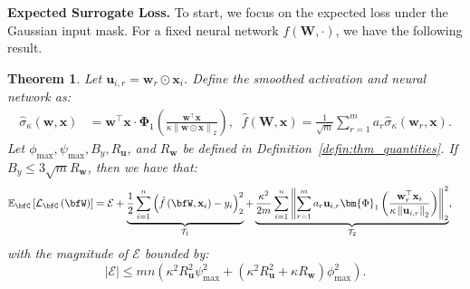 \documentclass[10pt]{article} %
\newtheorem{theorem}{Theorem}[section]
\theoremstyle{definition}
\theoremstyle{plain}
\newcommand{\paren}[1]{\left(#1\right)}
\newcommand{\norm}[1]{\left\|#1\right\|}
\newcommand{\act}[2]{\hat{\sigma}_{\kappa}\paren{#1,#2}}
\providecommand{\E}{\mathbb{E}}
\def\calL{{\mathcal{L}}}
\def\calT{{\mathcal{T}}}
\def\bfu{{\mathbf{u}}}\def\bfv{{\mathbf{v}}}\def\bfw{{\mathbf{w}}}\def\bfx{{\mathbf{x}}}
\begin{document}
\noindent \textbf{Expected Surrogate Loss.}
To start, we focus on the expected loss under the Gaussian input mask. For a fixed neural network $f\paren{\mathbf{W},\cdot}$, we have the following result.
\begin{theorem}
    \label{thm:exp_loss_approx}
    Let $\bfu_{i,r} = \bfw_r\odot\bfx_i$. Define the smoothed activation and neural network as:
    \begin{align*}
        \act{\bfw}{\bfx} &= \bfw^\top\bfx\cdot \bm{\Phi}_1\paren{\frac{\bfw^\top\bfx}{\kappa\norm{\bfw\odot\bfx}_2}},\;\;  \hat{f}\paren{\mathbf{W},\bfx}= \frac{1}{\sqrt{m}}\sum_{r=1}^ma_r\act{\bfw_r}{\bfx}.
    \end{align*}
    Let $\phi_{\max},\psi_{\max}, B_y, R_{\bfu}$, and $R_{\bfw}$ be defined in Definition~\ref{defin:thm_quantities}. If $B_y \leq 3\sqrt{m} R_{\bfw}$, then we have that:
    \begin{align*}
        & \E_{\bfC}\left[\calL_{\bfC}\paren{\bfW}\right]  = \mathcal{E} + \underbrace{\frac{1}{2}\sum_{i=1}^n\paren{\hat{f}\paren{\bfW,\bfx_i}-y_i}_2^2}_{\calT_1} + \underbrace{\frac{\kappa^2}{2m}\sum_{i=1}^n\norm{\sum_{r=1}^ma_r\bfu_{i,r}\bm{\Phi}_1\paren{\frac{\bfw_r^\top\bfx_i}{\kappa\norm{\bfu_{i,r}}_2}}}_2^2}_{\calT_2},
    \end{align*}
    with the magnitude of $\mathcal{E}$ bounded by:
    \begin{equation}
        \label{eq:mag_cap_epsilon}
        \left|\mathcal{E}\right| \leq mn\paren{\kappa^2R_{\bfu}^2\psi_{\max}^2 + \paren{\kappa^2R_{\bfu}^2 + \kappa R_{\bfw}}\phi_{\max}^2}.
    \end{equation}
\end{theorem}
\end{document}
